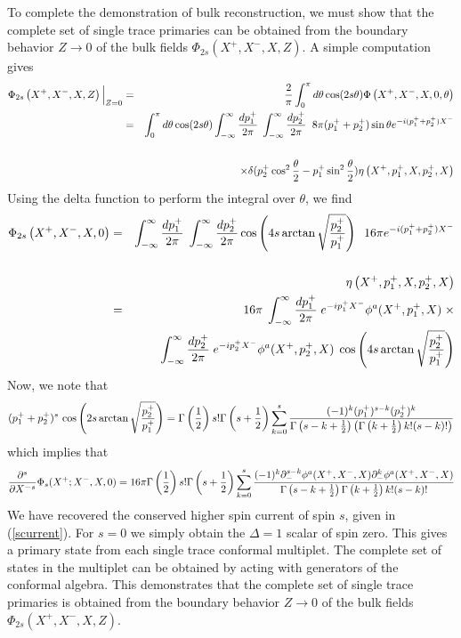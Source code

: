 \documentclass[a4paper,12pt]{article}
\begin{document}
To complete the demonstration of bulk reconstruction, we must show that the complete set of single trace primaries can be
obtained from  the boundary behavior $Z\to 0$ of the bulk fields $\Phi_{2s}\left(X^+,X^-,X,Z\right)$.
A simple computation gives
%
\begin{eqnarray}
\Phi_{2s}\left(X^+,X^-,X,Z\right)\Big|_{Z=0}&=&
{2\over \pi}\int_0^\pi d\theta \cos (2s\theta)\Phi\left(X^+,X^-,X,0,\theta\right)\cr
&=&\int_0^\pi d\theta \cos (2s\theta)\int_{-\infty}^\infty {dp_1^+\over 2\pi} \;\int_{-\infty}^\infty {dp_2^+\over 2\pi}
\; \; 8\pi(p_1^++p_2^+)\sin\theta e^{-i(p_1^++p_2^+)X^-}
\cr\cr
&&\times \delta (p_2^+\cos^2 {\theta\over 2}-p_1^+\sin^2 {\theta\over 2})
\eta\left(X^+,p_1^+,X,p_2^+,X\right)
\end{eqnarray}
%
Using the delta function to perform the integral over $\theta$, we find
%
\begin{eqnarray}
\Phi_{2s}\left(X^+,X^-,X,0\right)&=&
\int_{-\infty}^\infty {dp_1^+\over 2\pi} \;\int_{-\infty}^\infty {dp_2^+\over 2\pi}
\cos \left(4s \arctan\sqrt{p_2^+\over p_1^+}\right)
\; \; 16\pi e^{-i(p_1^++p_2^+)X^-}
\cr\cr
&&\eta\left(X^+,p_1^+,X,p_2^+,X\right)\cr
&=&16\pi\;
\int_{-\infty}^\infty {dp_1^+\over 2\pi} \; e^{-ip_1^+X^-} \phi^a(X^+,p_1^+,X)\;\times\cr
&&\int_{-\infty}^\infty {dp_2^+\over 2\pi}\; e^{-ip_2^+X^-} \phi^a(X^+,p_2^+,X)\;
\cos \left(4s \arctan\sqrt{p_2^+\over p_1^+}\right)
\end{eqnarray}
%
Now, we note that
%
\begin{equation}
(p_1^++p_2^+)^s\, \cos \left(2s \arctan\sqrt{p_2^+\over p_1^+}\right)
=\Gamma \left(\frac{1}{2}\right) s! \Gamma \left(s+\frac{1}{2}\right)
\sum_{k=0}^s
\frac{(-1)^k (p_1^+)^{s-k}(p_2^+)^k }
{\Gamma \left(s-k+\frac{1}{2}\right) \left(\Gamma \left(k+\frac{1}{2}\right) k! (s-k)!\right)}
\end{equation}
%
which implies that
%
\begin{eqnarray}
{\partial^s\over \partial X^-{}^s}\Phi_{s}(X^+;X^-,X,0)
=16\pi\Gamma \left(\frac{1}{2}\right) s! \Gamma \left(s+\frac{1}{2}\right)\sum_{k=0}^{s}
\frac{(-1)^k \partial_-^{s-k}\phi^a(X^+,X^-,X)\partial_-^{k}\phi^a(X^+,X^-,X) }
{\Gamma \left(s-k+\frac{1}{2}\right) \Gamma \left(k+\frac{1}{2}\right) k! (s-k)!}\cr
\end{eqnarray}
%
We have recovered the conserved higher spin current of spin $s$, given in (\ref{scurrent}).
For $s=0$ we simply obtain the $\Delta=1$ scalar of spin zero.
This gives a primary state from each single trace conformal multiplet.
The complete set of states in the multiplet can be obtained by acting with generators of the conformal
algebra.
This demonstrates that the complete set of single trace primaries is obtained from  the boundary behavior $Z\to 0$ of the 
bulk fields $\Phi_{2s}\left(X^+,X^-,X,Z\right)$.
\end{document}
